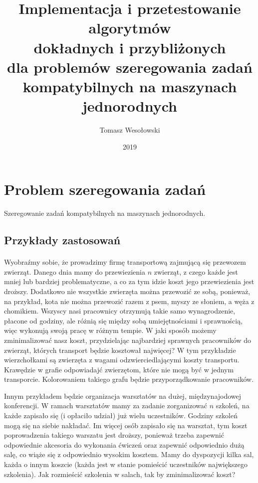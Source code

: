 \documentclass{article}
\title{%
	Implementacja i przetestowanie algorytmów \\
	dokładnych i przybliżonych \\
	dla problemów szeregowania zadań \\
	kompatybilnych na maszynach jednorodnych}
\author{Tomasz Wesołowski}
\date{2019}
\begin{document}
 
\maketitle
 
\tableofcontents
 
\section{Problem szeregowania zadań}

Szeregowanie zadań kompatybilnych na maszynach jednorodnych.

\subsection{Przykłady zastosowań}

\paragraph{} Wyobraźmy sobie, że prowadzimy firmę transportową zajmującą się przewozem zwierząt. Danego dnia mamy do przewiezienia $n$ zwierząt, z czego każde jest mniej lub bardziej problematyczne, a co za tym idzie koszt jego przewiezienia jest droższy. Dodatkowo nie wszystkie zwierzęta można przewozić ze sobą, ponieważ, na przykład, kota nie można przewozić razem z psem, myszy ze słoniem, a węża z chomikiem. 
Wszyscy nasi pracownicy otrzymują takie samo wynagrodzenie, płacone od godziny, ale różnią się między sobą umiejętnościami i sprawnością, więc wykonują swoją pracę w różnym tempie. W jaki sposób możemy zminimalizować nasz koszt, przydzielając najbardziej sprawnych pracowników do zwierząt, których transport będzie kosztował najwięcej? W tym przykładzie wierzchołkami są zwierzęta z wagami odzwierciedlającymi koszty transportu. Krawędzie w grafie odpowiadajć zwierzętom, które nie mogą być w jednym transporcie. Kolorowaniem takiego grafu będzie przyporządkowanie pracowników.

Innym przykładem będzie organizacja warsztatów na dużej, międzynajodowej konferencji. W ramach warsztatów mamy za zadanie zorganizować $n$ szkoleń, na każde zapisało się (i opłaciło udział) już wielu uczestników. Godziny szkoleń mogą się na siebie nakładać. Im więcej osób zapisało się na warsztat, tym koszt poprowadzenia takiego warszatu jest droższy, ponieważ trzeba zapewnić odpowiednie akcesoria do wykonania ćwiczeń oraz zapewnić odpowiednio dużą salę, co wiąże się z odpowiednio wysokim kosztem. Mamy do dyspozycji kilka sal, każda o innym koszcie (każda jest w stanie pomieścić uczestników największego szkolenia). Jak rozmieścić szkolenia w salach, tak by zminimalizować koszt?
\end{document}

